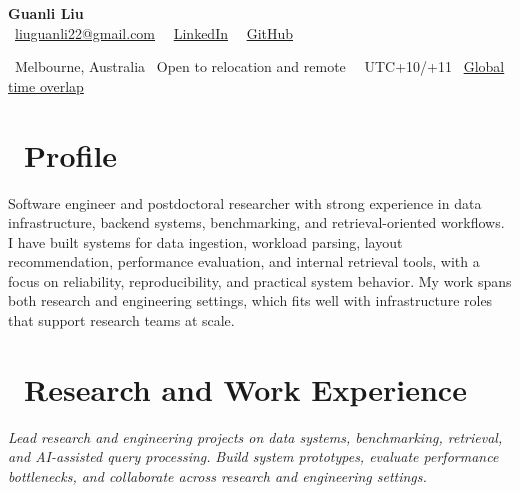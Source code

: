 \documentclass{resume}
\begin{document}

{\LARGE \textbf{Guanli Liu}}\\[-0.2em]
\faEnvelope\ \href{mailto:liuguanli22@gmail.com}{liuguanli22@gmail.com} 
\textperiodcentered\ 
\faLinkedin\ \href{https://www.linkedin.com/in/guanli-liu-11353058/}{LinkedIn} \textperiodcentered\ 
\faGithub\ \href{https://github.com/Liuguanli}{GitHub}

\faMapMarker\ Melbourne, Australia \textperiodcentered\ Open to relocation and remote \textperiodcentered\ 
\faClockO\  UTC+10/+11 \textperiodcentered\ 
\href{https://www.worldtimebuddy.com/?lid=5808079,5128581,5809844,1816670,2158177&h=2158177&hf=1}{Global time overlap \faExternalLink}
\vspace{0.4em}



\section{\faUser\ \textbf{Profile}}
Software engineer and postdoctoral researcher with strong experience in data infrastructure, backend systems, benchmarking, and retrieval-oriented workflows. I have built systems for data ingestion, workload parsing, layout recommendation, performance evaluation, and internal retrieval tools, with a focus on reliability, reproducibility, and practical system behavior. My work spans both research and engineering settings, which fits well with infrastructure roles that support research teams at scale.



\section{\faUsers\ \textbf{Research and Work Experience}}


\textit{Lead research and engineering projects on data systems, benchmarking, retrieval, and AI-assisted query processing.}
\textit{Build system prototypes, evaluate performance bottlenecks, and collaborate across research and engineering settings.}
\end{document}

